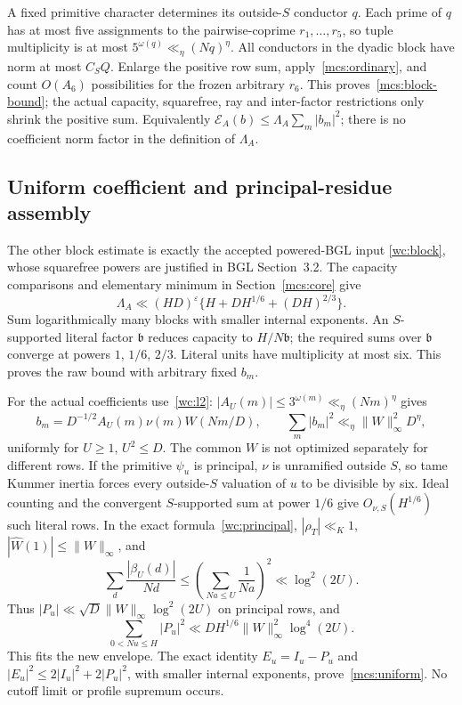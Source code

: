 A fixed primitive character determines its outside-$S$ conductor $q$.
Each prime of $q$ has at most five assignments to the pairwise-coprime
$r_1,\ldots,r_5$, so tuple multiplicity is at most
$5^{\omega(q)}\ll_\eta(Nq)^\eta$.
All conductors in the dyadic block have norm at most $C_SQ$.
Enlarge the positive row sum, apply~\eqref{mcs:ordinary}, and count
$O(A_6)$ possibilities for the frozen arbitrary $r_6$.
This proves~\eqref{mcs:block-bound}; the actual capacity, squarefree,
ray and inter-factor restrictions only shrink the positive sum.
Equivalently $\mathcal E_A(b)\le\Lambda_A\sum_m|b_m|^2$;
there is no coefficient norm factor in the definition of $\Lambda_A$.

\subsection{Uniform coefficient and principal-residue assembly}
The other block estimate is exactly the accepted powered-BGL input
\eqref{wc:block}, whose squarefree powers are justified in BGL
Section~3.2. The capacity comparisons and elementary minimum in
Section~\ref{mcs:core} give
\[
 \Lambda_A\ll(HD)^\varepsilon
          \{H+DH^{1/6}+(DH)^{2/3}\}.
\]
Sum logarithmically many blocks with smaller internal exponents.
An $S$-supported literal factor $\mathfrak b$ reduces capacity to
$H/N\mathfrak b$; the required sums over $\mathfrak b$ converge
at powers $1$, $1/6$, $2/3$. Literal units have multiplicity at most six.
This proves the raw bound with arbitrary fixed $b_m$.

For the actual coefficients use~\eqref{wc:l2}:
$|A_U(m)|\le3^{\omega(m)}\ll_\eta(Nm)^\eta$ gives
\[
 b_m=D^{-1/2}A_U(m)\nu(m)W(Nm/D),\qquad
       \sum_m|b_m|^2\ll_\eta\|W\|_\infty^2D^\eta,
\]
uniformly for $U\ge1$, $U^2\le D$. The common $W$ is not optimized
separately for different rows. If the primitive $\psi_u$ is principal,
$\nu$ is unramified outside $S$, so tame Kummer inertia forces every
outside-$S$ valuation of $u$ to be divisible by six. Ideal counting and
the convergent $S$-supported sum at power $1/6$ give
$O_{\nu,S}(H^{1/6})$ such literal rows.
In the exact formula~\eqref{wc:principal}, $|\rho_T|\ll_K1$,
$|\widehat W(1)|\le\|W\|_\infty$, and
\[
 \sum_d\frac{|\beta_U(d)|}{Nd}
 \le\left(\sum_{Na\le U}\frac1{Na}\right)^2
 \ll\log^2(2U).
\]
Thus $|P_u|\ll\sqrt D\|W\|_\infty\log^2(2U)$ on principal rows,
and
\[
 \sum_{0<Nu\le H}|P_u|^2
       \ll DH^{1/6}\|W\|_\infty^2\log^4(2U).
\]
This fits the new envelope. The exact identity $E_u=I_u-P_u$ and
$|E_u|^2\le2|I_u|^2+2|P_u|^2$, with smaller internal exponents,
prove~\eqref{mcs:uniform}. No cutoff limit or profile supremum occurs.

